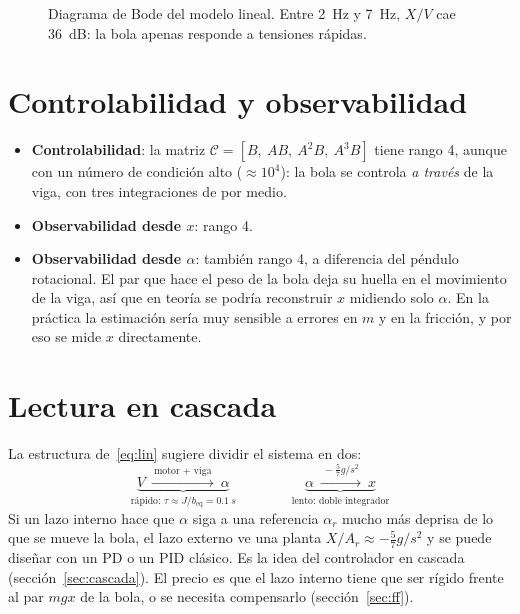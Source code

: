 \begin{figure}[H]
\centering
{}
\caption{Diagrama de Bode del modelo lineal. Entre \SI{2}{Hz} y \SI{7}{Hz}, $X/V$ cae \SI{36}{dB}: la bola apenas responde a tensiones rápidas.}
\label{fig:bode}
\end{figure}

\section{Controlabilidad y observabilidad}

\begin{itemize}
  \item \textbf{Controlabilidad}: la matriz $\mathcal C=[B,\ AB,\ A^2B,\ A^3B]$ tiene rango 4, aunque con un número de condición alto ($\approx10^4$): la bola se controla \emph{a través} de la viga, con tres integraciones de por medio.
  \item \textbf{Observabilidad desde $x$}: rango 4.
  \item \textbf{Observabilidad desde $\alpha$}: también rango 4, a diferencia del péndulo rotacional. El par que hace el peso de la bola deja su huella en el movimiento de la viga, así que en teoría se podría reconstruir $x$ midiendo solo $\alpha$. En la práctica la estimación sería muy sensible a errores en $m$ y en la fricción, y por eso se mide $x$ directamente.
\end{itemize}

\section{Lectura en cascada}

La estructura de~\eqref{eq:lin} sugiere dividir el sistema en dos:
\begin{equation}
  \underbrace{V\ \xrightarrow{\ \text{motor + viga}\ }\ \alpha}_{\text{rápido: } \tau\approx J/b_{\text{eq}}=\SI{0.1}{s}}
  \qquad\qquad
  \underbrace{\alpha\ \xrightarrow{\ -\frac57 g/s^2\ }\ x}_{\text{lento: doble integrador}}
\end{equation}
Si un lazo interno hace que $\alpha$ siga a una referencia $\alpha_r$ mucho más deprisa de lo que se mueve la bola, el lazo externo ve una planta $X/A_r\approx-\tfrac57g/s^2$ y se puede diseñar con un PD o un PID clásico. Es la idea del controlador en cascada (sección~\ref{sec:cascada}). El precio es que el lazo interno tiene que ser rígido frente al par $mgx$ de la bola, o se necesita compensarlo (sección~\ref{sec:ff}).

